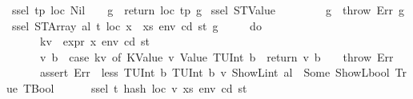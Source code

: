 \begin{isabellebody}
{\isacharbar}{\kern0pt}\ {\isachardoublequoteopen}ssel\ tp\ loc\ Nil\ {\isacharunderscore}{\kern0pt}\ {\isacharunderscore}{\kern0pt}\ {\isacharunderscore}{\kern0pt}\ g\ {\isacharequal}{\kern0pt}\ return\ {\isacharparenleft}{\kern0pt}loc{\isacharcomma}{\kern0pt}\ tp{\isacharparenright}{\kern0pt}\ g{\isachardoublequoteclose}\isanewline
{\isacharbar}{\kern0pt}\ {\isachardoublequoteopen}ssel\ {\isacharparenleft}{\kern0pt}STValue\ {\isacharunderscore}{\kern0pt}{\isacharparenright}{\kern0pt}\ {\isacharunderscore}{\kern0pt}\ {\isacharparenleft}{\kern0pt}{\isacharunderscore}{\kern0pt}\ {\isacharhash}{\kern0pt}\ {\isacharunderscore}{\kern0pt}{\isacharparenright}{\kern0pt}\ {\isacharunderscore}{\kern0pt}\ {\isacharunderscore}{\kern0pt}\ {\isacharunderscore}{\kern0pt}\ g\ {\isacharequal}{\kern0pt}\ throw\ Err\ g{\isachardoublequoteclose}\isanewline
{\isacharbar}{\kern0pt}\ {\isachardoublequoteopen}ssel\ {\isacharparenleft}{\kern0pt}STArray\ al\ t{\isacharparenright}{\kern0pt}\ loc\ {\isacharparenleft}{\kern0pt}x\ {\isacharhash}{\kern0pt}\ xs{\isacharparenright}{\kern0pt}\ env\ cd\ st\ g\ {\isacharequal}{\kern0pt}\isanewline
\ \ \ \ {\isacharparenleft}{\kern0pt}do\ {\isacharbraceleft}{\kern0pt}\isanewline
\ \ \ \ \ \ kv\ {\isasymleftarrow}\ expr\ x\ env\ cd\ st{\isacharsemicolon}{\kern0pt}\isanewline
\ \ \ \ \ \ {\isacharparenleft}{\kern0pt}v{\isacharcomma}{\kern0pt}\ b{\isacharparenright}{\kern0pt}\ {\isasymleftarrow}\ case\ kv\ of\ {\isacharparenleft}{\kern0pt}KValue\ v{\isacharcomma}{\kern0pt}\ Value\ {\isacharparenleft}{\kern0pt}TUInt\ b{\isacharparenright}{\kern0pt}{\isacharparenright}{\kern0pt}\ {\isasymRightarrow}\ return\ {\isacharparenleft}{\kern0pt}v{\isacharcomma}{\kern0pt}\ b{\isacharparenright}{\kern0pt}\ {\isacharbar}{\kern0pt}\ {\isacharunderscore}{\kern0pt}\ {\isasymRightarrow}\ throw\ Err{\isacharsemicolon}{\kern0pt}\isanewline
\ \ \ \ \ \ assert\ Err\ {\isacharparenleft}{\kern0pt}{\isasymlambda}{\isacharunderscore}{\kern0pt}{\isachardot}{\kern0pt}\ less\ {\isacharparenleft}{\kern0pt}TUInt\ b{\isacharparenright}{\kern0pt}\ {\isacharparenleft}{\kern0pt}TUInt\ b{}{}{}{\isacharparenright}{\kern0pt}\ v\ {\isacharparenleft}{\kern0pt}ShowL\isactrlsub i\isactrlsub n\isactrlsub t\ al{\isacharparenright}{\kern0pt}\ {\isacharequal}{\kern0pt}\ Some\ {\isacharparenleft}{\kern0pt}ShowL\isactrlsub b\isactrlsub o\isactrlsub o\isactrlsub l\ True{\isacharcomma}{\kern0pt}\ TBool{\isacharparenright}{\kern0pt}{\isacharparenright}{\kern0pt}{\isacharsemicolon}{\kern0pt}\isanewline
\ \ \ \ \ \ ssel\ t\ {\isacharparenleft}{\kern0pt}hash\ loc\ v{\isacharparenright}{\kern0pt}\ xs\ env\ cd\ st\isanewline

\end{isabellebody}
